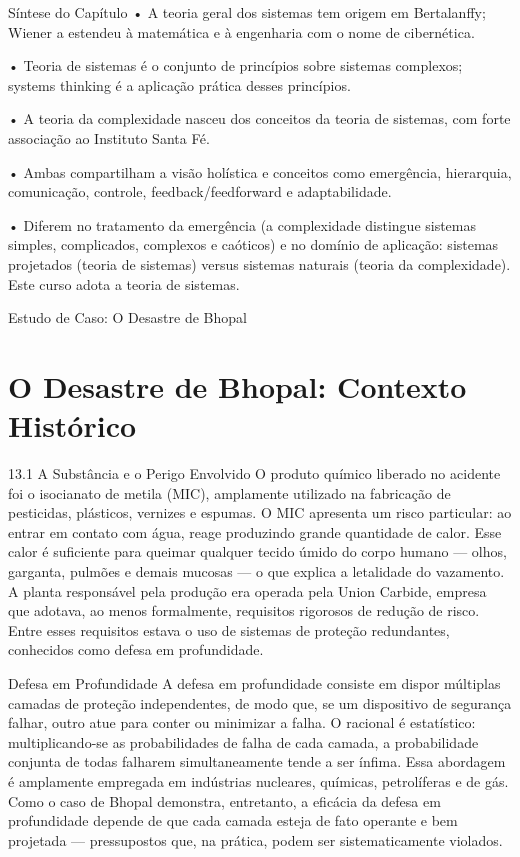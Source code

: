 Síntese do Capítulo • A teoria geral dos sistemas tem origem em Bertalanffy; Wiener a estendeu à matemática e à engenharia com o nome de cibernética.

• Teoria de sistemas é o conjunto de princípios sobre sistemas complexos; systems thinking é a aplicação prática desses princípios.

• A teoria da complexidade nasceu dos conceitos da teoria de sistemas, com forte associação ao Instituto Santa Fé.

• Ambas compartilham a visão holística e conceitos como emergência, hierarquia, comunicação, controle, feedback/feedforward e adaptabilidade.

• Diferem no tratamento da emergência (a complexidade distingue sistemas simples, complicados, complexos e caóticos) e no domínio de aplicação: sistemas projetados (teoria de sistemas) versus sistemas naturais (teoria da complexidade). Este curso adota a teoria de sistemas.

Estudo de Caso: O Desastre de Bhopal

\chapter{O Desastre de Bhopal: Contexto Histórico}

13.1 A Substância e o Perigo Envolvido O produto químico liberado no acidente foi o isocianato de metila (MIC), amplamente utilizado na fabricação de pesticidas, plásticos, vernizes e espumas. O MIC apresenta um risco particular: ao entrar em contato com água, reage produzindo grande quantidade de calor. Esse calor é suficiente para queimar qualquer tecido úmido do corpo humano — olhos, garganta, pulmões e demais mucosas — o que explica a letalidade do vazamento. A planta responsável pela produção era operada pela Union Carbide, empresa que adotava, ao menos formalmente, requisitos rigorosos de redução de risco. Entre esses requisitos estava o uso de sistemas de proteção redundantes, conhecidos como defesa em profundidade.

Defesa em Profundidade A defesa em profundidade consiste em dispor múltiplas camadas de proteção independentes, de modo que, se um dispositivo de segurança falhar, outro atue para conter ou minimizar a falha. O racional é estatístico: multiplicando-se as probabilidades de falha de cada camada, a probabilidade conjunta de todas falharem simultaneamente tende a ser ínfima. Essa abordagem é amplamente empregada em indústrias nucleares, químicas, petrolíferas e de gás. Como o caso de Bhopal demonstra, entretanto, a eficácia da defesa em profundidade depende de que cada camada esteja de fato operante e bem projetada — pressupostos que, na prática, podem ser sistematicamente violados.

